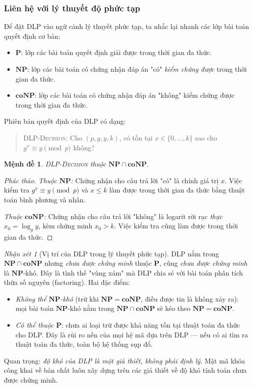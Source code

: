 \documentclass[12pt,a4paper]{report}
\newtheorem{proposition}[theorem]{Mệnh đề}
\theoremstyle{definition}
\theoremstyle{remark}
\newtheorem{remark}[theorem]{Nhận xét}
\begin{document}
\subsubsection{Liên hệ với lý thuyết độ phức tạp}

Để đặt DLP vào ngữ cảnh lý thuyết phức tạp, ta nhắc lại nhanh các lớp bài toán quyết định cơ bản:
\begin{itemize}[leftmargin=*]
    \item $\mathbf{P}$: lớp các bài toán quyết định giải được trong thời gian đa thức.
    \item $\mathbf{NP}$: lớp các bài toán có chứng nhận đáp án "có" \emph{kiểm chứng được} trong thời gian đa thức.
    \item $\mathbf{coNP}$: lớp các bài toán có chứng nhận đáp án "không" kiểm chứng được trong thời gian đa thức.
\end{itemize}

Phiên bản quyết định của DLP có dạng:
\begin{quote}
\textsc{DLP-Decision}: Cho $(p, g, y, k)$, có tồn tại $x \in \{0, \ldots, k\}$ sao cho $g^x \equiv y \pmod{p}$ không?
\end{quote}

\begin{proposition}
\textsc{DLP-Decision} thuộc $\mathbf{NP} \cap \mathbf{coNP}$.
\end{proposition}

\begin{proof}[Phác thảo]
\emph{Thuộc $\mathbf{NP}$:} Chứng nhận cho câu trả lời "có" là chính giá trị $x$. Việc kiểm tra $g^x \equiv y \pmod{p}$ và $x \leq k$ làm được trong thời gian đa thức bằng thuật toán bình phương và nhân.

\emph{Thuộc $\mathbf{coNP}$:} Chứng nhận cho câu trả lời "không" là logarit rời rạc \emph{thực} $x_0 = \log_g y$, kèm chứng minh $x_0 > k$. Việc kiểm tra cũng làm được trong thời gian đa thức.
\end{proof}

\begin{remark}[Vị trí của DLP trong lý thuyết phức tạp]
DLP nằm trong $\mathbf{NP} \cap \mathbf{coNP}$ nhưng \emph{chưa được chứng minh} thuộc $\mathbf{P}$, cũng \emph{chưa được chứng minh} là $\mathbf{NP}$-khó. Đây là tình thế "vùng xám" mà DLP chia sẻ với bài toán phân tích thừa số nguyên (factoring). Hai đặc điểm:
\begin{itemize}[leftmargin=*]
    \item \emph{Không thể $\mathbf{NP}$-khó} (trừ khi $\mathbf{NP} = \mathbf{coNP}$, điều được tin là không xảy ra): mọi bài toán $\mathbf{NP}$-khó nằm trong $\mathbf{NP} \cap \mathbf{coNP}$ sẽ kéo theo $\mathbf{NP} = \mathbf{coNP}$.
    \item \emph{Có thể thuộc $\mathbf{P}$}: chưa ai loại trừ được khả năng tồn tại thuật toán đa thức cho DLP. Đây là rủi ro nền của mọi hệ mã dựa trên DLP --- nếu có ai tìm ra thuật toán đa thức, toàn bộ hệ thống sụp đổ.
\end{itemize}
Quan trọng: \emph{độ khó của DLP là một giả thiết, không phải định lý}. Mật mã khóa công khai về bản chất luôn xây dựng trên các giả thiết về độ khó tính toán chưa được chứng minh.
\end{remark}
\end{document}
